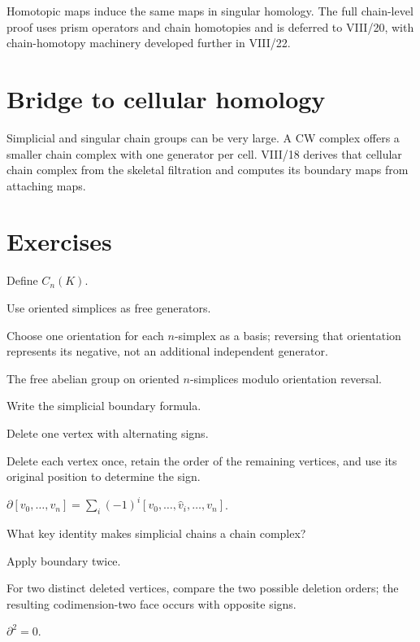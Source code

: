 Homotopic maps induce the same maps in singular homology.  The full chain-level
proof uses prism operators and chain homotopies and is deferred to VIII/20,
with chain-homotopy machinery developed further in VIII/22.

\section{Bridge to cellular homology}

Simplicial and singular chain groups can be very large.  A CW complex offers a
smaller chain complex with one generator per cell.  VIII/18 derives that
cellular chain complex from the skeletal filtration and computes its boundary
maps from attaching maps.


\section{Exercises}

\begin{exercise}\label{exr:viii17-01}
Define \(C_n(K)\).
\end{exercise}
\begin{hint}
Use oriented simplices as free generators.

Choose one orientation for each \(n\)-simplex as a basis; reversing that orientation represents its negative, not an additional independent generator.
\end{hint}
\begin{solution}
The free abelian group on oriented \(n\)-simplices modulo orientation reversal.
\end{solution}

\begin{exercise}\label{exr:viii17-02}
Write the simplicial boundary formula.
\end{exercise}
\begin{hint}
Delete one vertex with alternating signs.

Delete each vertex once, retain the order of the remaining vertices, and use its original position to determine the sign.
\end{hint}
\begin{solution}
\(\partial[v_0,\dots,v_n]=\sum_i(-1)^i[v_0,\dots,\widehat v_i,\dots,v_n]\).
\end{solution}

\begin{exercise}\label{exr:viii17-03}
What key identity makes simplicial chains a chain complex?
\end{exercise}
\begin{hint}
Apply boundary twice.

For two distinct deleted vertices, compare the two possible deletion orders; the resulting codimension-two face occurs with opposite signs.
\end{hint}
\begin{solution}
\(\partial^2=0\).
\end{solution}

